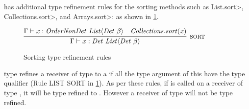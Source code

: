 \TheDeterminismChecker has additional type refinement rules for the sorting
methods such as \<List.sort>, \<Collections.sort>, and \<Arrays.sort>:
 as shown in \cref{fig-sorting}.
\begin{figure}
%     
    
    $\infer[\rulename{sort}]{\Gamma \vdash x : \|Det \ List|\angles{\|Det| \ \beta}}{\Gamma \vdash x : \|OrderNonDet \ List|\angles{\|Det| \ \beta} & \|Collections.sort(x)|}$
    
%     
    
    \caption{Sorting type refinement rules}
    \label{fig-sorting}
\end{figure}
\TheDeterminismChecker type refines a receiver of type  to a  if all the
type argument of this  have the type qualifier  (Rule LIST SORT in \cref{fig-sorting}).
As per these rules, if  is called on a receiver of type , it will
be type refined to . However a receiver of type  will not be type refined.


